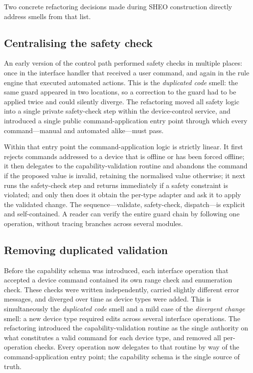 Two concrete refactoring decisions made during SHEO construction directly address
smells from that list.

\subsection{Centralising the safety check}

An early version of the control path performed safety checks in multiple places: once
in the interface handler that received a user command, and again in the rule engine
that executed automated actions. This is the \emph{duplicated code} smell:
the same guard appeared in two locations, so a correction to the guard had to be
applied twice and could silently diverge. The refactoring moved all safety logic into
a single private safety-check step within the device-control service, and introduced a
single public command-application entry point through which every command---manual and
automated alike---must pass.

\label{lst:apply}%
Within that entry point the command-application logic is strictly linear. It first
rejects commands addressed to a device that is offline or has been forced offline; it
then delegates to the capability-validation routine and abandons the command if the
proposed value is invalid, retaining the normalised value otherwise; it next runs the
safety-check step and returns immediately if a safety constraint is violated; and only
then does it obtain the per-type adapter and ask it to apply the validated change. The
sequence---validate, safety-check, dispatch---is explicit and self-contained. A reader
can verify the entire guard chain by following one operation, without tracing branches
across several modules.

\subsection{Removing duplicated validation}

Before the capability schema was introduced, each interface operation that accepted a
device command contained its own range check and enumeration check. These checks were
written independently, carried slightly different error messages, and diverged over time
as device types were added. This is simultaneously the \emph{duplicated code} smell and
a mild case of the \emph{divergent change} smell: a new device type required edits
across several interface operations. The refactoring introduced the capability-validation
routine as the single authority on what constitutes a valid command for each device
type, and removed all per-operation checks. Every operation now delegates to that
routine by way of the command-application entry point; the capability schema is the
single source of truth.

